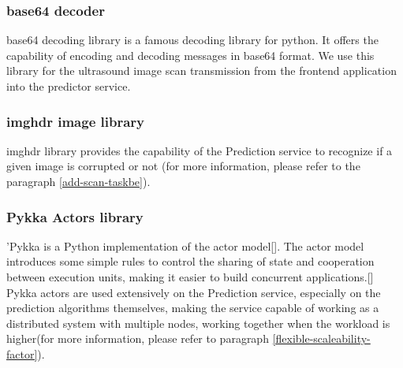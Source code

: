 			\subsubsection{base64 decoder}
				base64 decoding library is a famous decoding library for python. It offers the capability of encoding and decoding 
				messages in base64 format. We use this library for the ultrasound image scan transmission from the frontend application 
				into the predictor service.
			\subsubsection{imghdr image library}
				imghdr library provides the capability of the Prediction service to recognize if a given image is corrupted or not 
				(for more information, please refer to the paragraph \ref{add-scan-taskbe}).
			\subsubsection{Pykka Actors library}
				'Pykka is a Python implementation of the actor model[\cite{hewitt2015actor}]. The actor model introduces some 
				simple rules to control the sharing of state and cooperation between execution units, making it easier to build 
				concurrent applications.[\cite{magnus_2010}] Pykka actors are used extensively on the Prediction service, 
				especially on the prediction algorithms themselves, making the service capable of working as a distributed 
				system with multiple nodes, working together when the workload is higher(for more information, please refer to 
				paragraph \ref{flexible-scaleability-factor}).
				
